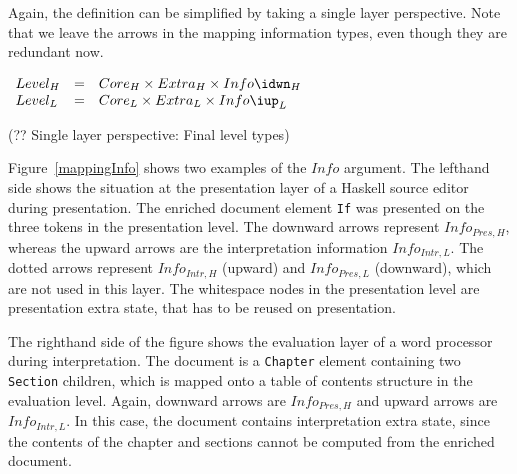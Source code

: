 Again, the definition can be simplified by taking a single layer perspective. Note that we leave the arrows in the  mapping information types, even though they are redundant now.

\begin{small}\(\begin{array}{lcll} \label{inv:extraStateSL}
Level_{H} & = & Core_{H} \times Extra_{H} \times Info\idwn_{H}\\
Level_{L} & = & Core_{L} \times Extra_{L} \times Info\iup_{L}\\
\end{array}\)\end{small}
\begin{center}(?? Single layer perspective: Final level types)\end{center}\vspace{1em}

\bc
Figure~\ref{mappingInfo} shows two examples of the $Info$ argument. The lefthand side shows the situation at the presentation layer of a Haskell source editor during presentation.  The enriched document element \verb|If|  was presented on the three tokens in the presentation level. The downward arrows represent $Info_{Pres,H}$, whereas the upward arrows are the interpretation information $Info_{Intr, L}$. The dotted arrows represent $Info_{Intr,H}$ (upward) and $Info_{Pres,L}$ (downward), which are not used in this layer. The whitespace nodes in the presentation level are presentation extra state, that has to be reused on presentation. 

The righthand side of the figure shows the evaluation layer of a word processor during interpretation. The document is a \verb|Chapter| element containing two \verb|Section| children, which is mapped onto a table of contents structure in the evaluation level. Again, downward arrows are $Info_{Pres,H}$ and upward arrows are $Info_{Intr,L}$.  In this case, the document contains interpretation extra state, since the contents of the chapter and sections cannot be computed from the enriched document.  

